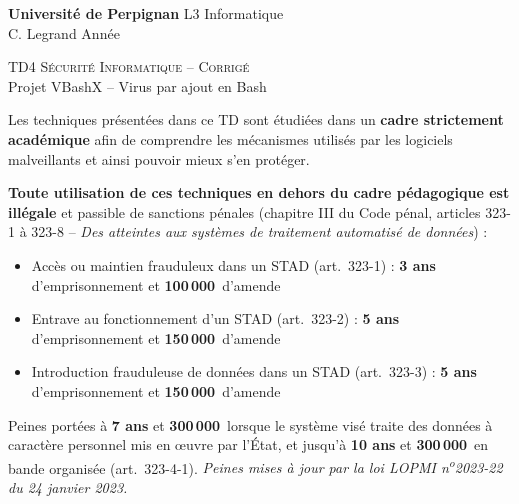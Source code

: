\documentclass[a4paper,11pt]{article}
\theoremstyle{plain}
\theoremstyle{definition}
\begin{document}
\hbox{}
\noindent \textbf{Université de Perpignan} \hfill  L3 Informatique \\
 \hfill C. Legrand \hfill  Année \the\year  \\
\smallskip
\begin{center}
{
 {\scshape \large TD4 Sécurité Informatique -- Corrigé}  \\
 Projet VBashX -- Virus par ajout en Bash
}
\end{center}
\hbox{}

\bigskip

\begin{ethique}
Les techniques présentées dans ce TD sont étudiées dans un \textbf{cadre strictement académique} afin de comprendre les mécanismes utilisés par les logiciels malveillants et ainsi pouvoir mieux s'en protéger.

\textbf{Toute utilisation de ces techniques en dehors du cadre pédagogique est illégale} et passible de sanctions pénales (chapitre III du Code pénal, articles 323-1 à 323-8 -- \textit{Des atteintes aux systèmes de traitement automatisé de données}) :
\begin{itemize}
    \item Accès ou maintien frauduleux dans un STAD (art.~323-1) : \textbf{3 ans} d'emprisonnement et \textbf{100\,000\,\texteuro{}} d'amende
    \item Entrave au fonctionnement d'un STAD (art.~323-2) : \textbf{5 ans} d'emprisonnement et \textbf{150\,000\,\texteuro{}} d'amende
    \item Introduction frauduleuse de données dans un STAD (art.~323-3) : \textbf{5 ans} d'emprisonnement et \textbf{150\,000\,\texteuro{}} d'amende
\end{itemize}
Peines portées à \textbf{7 ans} et \textbf{300\,000\,\texteuro{}} lorsque le système visé traite des données à caractère personnel mis en \oe uvre par l'État, et jusqu'à \textbf{10 ans} et \textbf{300\,000\,\texteuro{}} en bande organisée (art.~323-4-1). \textit{Peines mises à jour par la loi LOPMI n\textsuperscript{o}2023-22 du 24 janvier 2023.}
\end{ethique}

\bigskip

\end{document}
